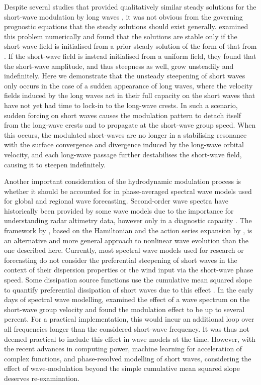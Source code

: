 \documentclass[lineno]{jfm}
\begin{document}
Despite several studies that provided qualitatively similar steady solutions
for the short-wave modulation by long waves
\citep{longuet1960changes,phillips1981dispersion,longuet1987propagation,henyey1988energy,zhang1990evolution},
it was not obvious from the governing prognostic equations that the steady
solutions should exist generally.
\citet{peureux2021unsteady} examined this problem numerically and found that
the solutions are stable only if the short-wave field is initialised from
a prior steady solution of the form of that from \citet{longuet1960changes}.
If the short-wave field is instead initialised from a uniform field, they
found that the short-wave amplitude, and thus steepness as well, grow
unsteadily and indefinitely.
Here we demonstrate that the unsteady steepening of short
waves only occurs in the case of a sudden appearance of long waves, where
the velocity fields induced by the long waves act in their full capacity
on the short waves that have not yet had time to lock-in to the long-wave
crests.
In such a scenario, sudden forcing on short waves causes the modulation
pattern to detach itself from the long-wave crests and to propagate at the
short-wave group speed.
When this occurs, the modulated short-waves are no longer in a stabilising
resonance with the surface convergence and divergence induced by the long-wave
orbital velocity, and each long-wave passage further destabilises the short-wave
field, causing it to steepen indefinitely.

Another important consideration of the hydrodynamic modulation process is
whether it should be accounted for in phase-averaged spectral wave
models \citep{group1988wam,tolman1991third,donelan2012modeling} used for global
and regional wave forecasting.
Second-order wave spectra have historically been provided by some wave models
due to the importance for understanding radar altimetry data, however only in a
diagnostic capacity \citep[e.g.,][]{janssen2009some}.
The framework by \citet{janssen2009some}, based on the Hamiltonian and
the action series expansion by \citet{zakharov1968stability}, is an alternative
and more general approach to nonlinear wave evolution than the one described
here.
Currently, most spectral wave models used for research or forecasting
do not consider the preferential steepening of short waves in the context
of their dispersion properties or the wind input via the short-wave phase speed.
Some dissipation source functions use the cumulative mean squared slope
to quantify preferential dissipation of short waves due to this effect
\citep{donelan2012modeling,romero2019distribution}.
In the early days of spectral wave modelling, \citet{willebrand1975energy}
examined the effect of a wave spectrum on the short-wave group velocity
and found the modulation effect to be up to several percent.
For a practical implementation, this would incur an additional loop over all
frequencies longer than the considered short-wave frequency.
It was thus not deemed practical to include this effect in wave models at the
time.
However, with the recent advances in computing power, machine learning for
acceleration of complex functions, and phase-resolved modelling of short waves,
considering the effect of wave-modulation beyond the simple cumulative mean
squared slope deserves re-examination.
\end{document}

